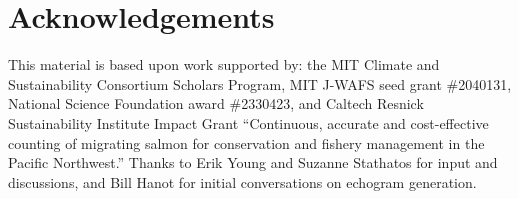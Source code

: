 \section*{Acknowledgements}

This material is based upon work supported by: the MIT Climate and Sustainability Consortium Scholars Program, MIT J-WAFS seed grant \#2040131, National Science Foundation award \#2330423, and Caltech Resnick Sustainability Institute Impact Grant ``Continuous, accurate and cost-effective counting of migrating salmon for conservation and fishery management in the Pacific Northwest.'' Thanks to Erik Young and Suzanne Stathatos for input and discussions, and Bill Hanot for initial conversations on echogram generation.